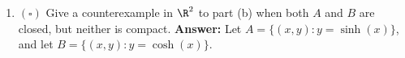 \documentclass[letterpaper]{article}
\begin{document}
\begin{enumerate}
\begin{enumerate}[label=(\alph*)]
	\item $(\square)$ Give a counterexample in $\R^2$ to part (b) when both $A$ and $B$ are closed, but neither is compact. 
	\textbf{Answer:} Let $A=\{(x,y):y=\sinh(x)\}$, and let $B=\{(x,y):y=\cosh(x)\}$. 
	
	\end{enumerate}
\end{enumerate}
\end{document}
